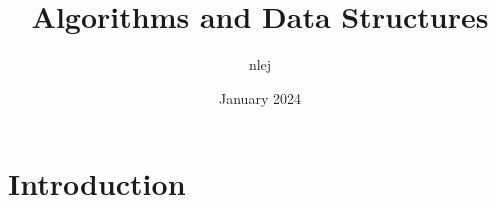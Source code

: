 \documentclass{article}
\title{Algorithms and Data Structures}
\author{nlej }
\date{January 2024}
\begin{document}
\maketitle

\section{Introduction}
\end{document}
